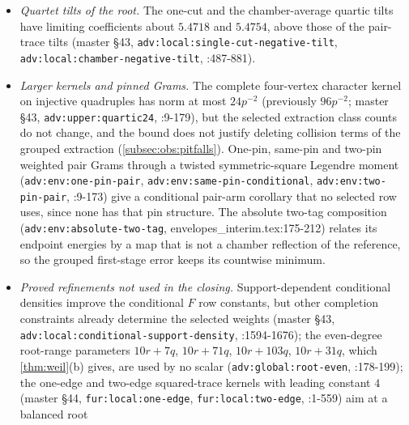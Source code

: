 \begin{itemize}
 every direction on the finite grid of mixture weights tested in the two named records worsened the complete bound, and the tests are not an optimality proof
 (,
 :128-135).
\item \emph{Quartet tilts of the root.} The one-cut and the chamber-average
 quartic tilts have limiting coefficients about $5.4718$ and $5.4754$, above
 those of the pair-trace tilts (master \S43,
 \texttt{adv:local:single-cut-negative-tilt},
 \texttt{adv:local:chamber-negative-tilt},
 :487-881).
\item \emph{Larger kernels and pinned Grams.} The complete four-vertex character
 kernel on injective quadruples has norm at most $24p^{-2}$ (previously
 $96p^{-2}$; master \S43, \texttt{adv:upper:quartic24},
 :9-179), but the selected extraction class counts do not change, and the bound does not justify
 deleting collision terms of the grouped extraction (\cref{subsec:obs:pitfalls}).
 One-pin, same-pin and two-pin weighted pair Grams through a twisted
 symmetric-square Legendre moment (\texttt{adv:env:one-pin-pair},
 \texttt{adv:env:same-pin-conditional}, \texttt{adv:env:two-pin-pair},
 :9-173) give a
 conditional pair-arm corollary that no selected row uses, since none has that
 pin structure. The absolute two-tag composition
 (\texttt{adv:env:absolute-two-tag}, envelopes\_interim.tex:175-212) relates its
 endpoint energies by a map that is not a chamber reflection of the reference,
 so the grouped first-stage error keeps its countwise minimum.
\item \emph{Proved refinements not used in the closing.} Support-dependent conditional
 densities improve the conditional $F$ row constants, but other completion
 constraints already determine the selected weights (master \S43,
 \texttt{adv:local:conditional-support-density},
 :1594-1676); the even-degree
 root-range parameters $10r+7q$, $10r+71q$, $10r+103q$, $10r+31q$, which
 \cref{thm:weil}(b) gives, are used by no scalar (\texttt{adv:global:root-even},
 :178-199); the one-edge and
 two-edge squared-trace kernels with leading constant $4$ (master \S44,
 \texttt{fur:local:one-edge}, \texttt{fur:local:two-edge},
 :1-559) aim at a balanced root

\end{itemize}
